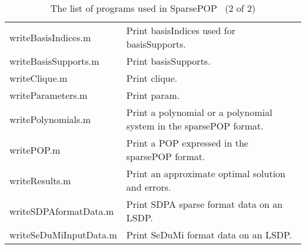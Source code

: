 \begin{table}
\begin{tabular}{|l|p{10cm}|}
writeBasisIndices.m &  Print {\sf basisIndices}  used for {\sf basisSupports}.\\
writeBasisSupports.m & Print {\sf basisSupports}.\\
writeClique.m & Print {\sf clique}.\\
writeParameters.m & Print {\sf param}. \\
writePolynomials.m &  Print a polynomial or a polynomial system in the sparsePOP format. \\ 
writePOP.m & Print a POP expressed in the sparsePOP format.\\
writeResults.m & Print an approximate optimal solution and errors.\\
writeSDPAformatData.m  & Print SDPA sparse format data on an LSDP. \\
writeSeDuMiInputData.m  & Print SeDuMi format data on an LSDP. \\ 
\hline
\end{tabular}
\label{prog2}
\caption{The list of programs used in SparsePOP  \ (2 of 2)}
\end{table}
 
